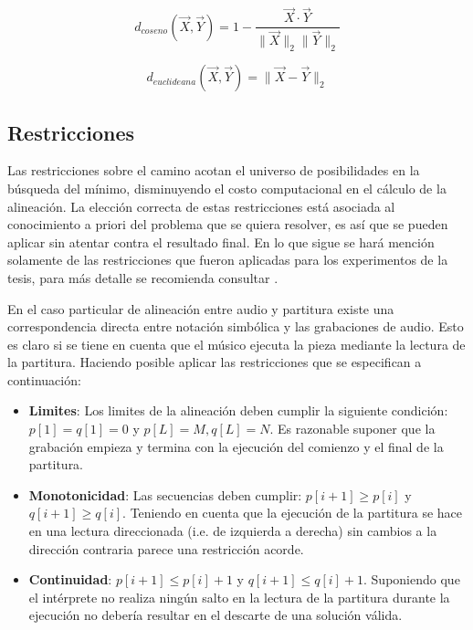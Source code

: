 \documentclass
  [ams,pdfout]%
	{aeslac}
\begin{document}
\begin{equation}
\label{eq:dist_coseno_ok}
d_{coseno}(\vec{X},\vec{Y}) = 1 - \frac{\vec{X}\cdot\vec{Y}}{\lVert\vec{X}\rVert_{2}\lVert\vec{Y}\rVert_{2}}
\end{equation}

\begin{equation}
\label{eq:dist_euclideana}
d_{euclideana}(\vec{X},\vec{Y}) = \lVert \vec{X} - \vec{Y} \rVert_{2}
\end{equation}


\subsection{Restricciones}
\label{sec:restricciones}

Las restricciones sobre el camino acotan el universo de posibilidades en la búsqueda del mínimo, disminuyendo el costo computacional en el cálculo de la alineación. La elección correcta de estas restricciones está asociada al conocimiento a priori del problema que se quiera resolver, es así que se pueden aplicar sin atentar contra el resultado final. En lo que sigue se hará mención solamente de las restricciones que fueron aplicadas para los experimentos de la tesis, para más detalle se recomienda consultar \cite{muller2007information}.
  
En el caso particular de alineación entre audio y partitura existe una correspondencia directa entre notación simbólica y las grabaciones de audio. Esto es claro si se tiene en cuenta que el músico ejecuta la pieza mediante la lectura de la partitura. Haciendo posible aplicar las restricciones que se especifican a continuación:

\begin{itemize}
\item \textbf{Limites}: Los limites de la alineación deben cumplir la siguiente condición: $p[1] = q [1] = 0$ y $p[L] = M, q[L] = N$. Es razonable suponer que la grabación empieza y termina con la ejecución del comienzo y el final de la partitura.
\item \textbf{Monotonicidad}: Las secuencias deben cumplir: $p[i+1] \geq p[i]$ y $q[i+1] \geq q[i]$. Teniendo en cuenta que la ejecución de la partitura se hace en una lectura direccionada (i.e. de izquierda a derecha) sin cambios a la dirección contraria parece una restricción acorde. 
\item \textbf{Continuidad}: $p[i+1] \leq p[i] + 1$ y $q[i+1] \leq q[i] + 1$.  Suponiendo que el intérprete no realiza ningún salto en la lectura de la partitura durante la ejecución no debería resultar en el descarte de una solución válida. 
\end{itemize}
\end{document}
